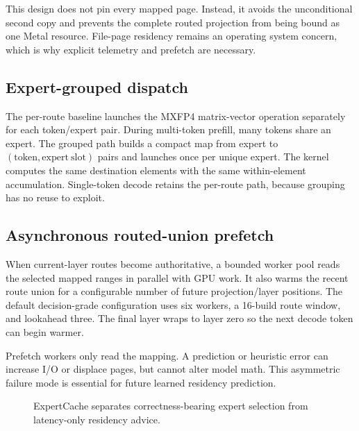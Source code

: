 \documentclass[10pt,twocolumn]{article}
\newcommand{\system}{ExpertCache}
\begin{document}
This design does not pin every mapped page.  Instead, it avoids the
unconditional second copy and prevents the complete routed projection from
being bound as one Metal resource.  File-page residency remains an operating
system concern, which is why explicit telemetry and prefetch are necessary.

\subsection{Expert-grouped dispatch}

The per-route baseline launches the MXFP4 matrix-vector operation separately
for each token/expert pair.  During multi-token prefill, many tokens share an
expert.  The grouped path builds a compact map from expert to
$(\mathrm{token},\mathrm{expert\ slot})$ pairs and launches once per unique
expert.  The kernel computes the same destination elements with the same
within-element accumulation.  Single-token decode retains the per-route path,
because grouping has no reuse to exploit.

\subsection{Asynchronous routed-union prefetch}

When current-layer routes become authoritative, a bounded worker pool reads
the selected mapped ranges in parallel with GPU work.  It also warms the
recent route union for a configurable number of future projection/layer
positions.  The default decision-grade configuration uses six workers, a
16-build route window, and lookahead three.  The final layer wraps to layer
zero so the next decode token can begin warmer.

Prefetch workers only read the mapping.  A prediction or heuristic error can
increase I/O or displace pages, but cannot alter model math.  This asymmetric
failure mode is essential for future learned residency prediction.

\begin{figure}[t]
\centering
{}
\caption{\system{} separates correctness-bearing expert selection from
latency-only residency advice.}
\label{fig:architecture}
\end{figure}
\end{document}
